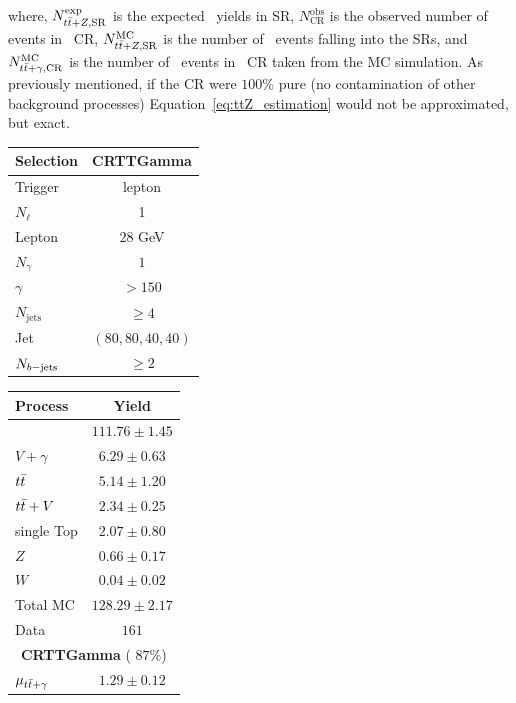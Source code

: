 		\noindent where, $N_{t\bar{t}+Z,\mathrm{SR}}^{\mathrm{exp}}$ is the expected \ttZ\ yields in \ac{SR}, $N_{\mathrm{CR}}^{\mathrm{obs}}$ is the observed number of events in \ttgamma\ \ac{CR}, $N_{t\bar{t}+Z,\mathrm{SR}}^{\mathrm{MC}}$ is the number of \ttZ\ events falling into the \acp{SR}, and $N_{t\bar{t}+\gamma,\mathrm{CR}}^{\mathrm{MC}}$ is the number of \ttgamma\ events in \ttgamma\ \ac{CR} taken from the \ac{MC} simulation. As previously mentioned, if the \ac{CR} were $100\%$ pure (no contamination of other background processes) Equation~\ref{eq:ttZ_estimation} would not be approximated, but exact.

		\begin{table}
			\parbox{.45\linewidth}{
			\centering
			\label{tab:CRTTGamma}
		   	\begin{tabular}{lc}
			      \toprule
			      \textbf{Selection}  & \textbf{CRTTGamma} \\
			      \toprule
			      Trigger & lepton \\ 
			      $N_{\ell}$ & 1 \\
			      Lepton \pt & $28$ GeV \\
			      \midrule
			      $N_{\gamma}$ & $1$\\
			      $\gamma$ \pT\ & $> 150$ \GeV \\
			      \midrule
			      $N_{\mathrm{jets}}$ & $ \geq 4 $ \\
			      Jet \pT\ & $(80,80,40,40)$ \GeV \\
			      $N_{b\mathrm{-jets}}$ & $\ge 2$ \\
			      \bottomrule
			   \end{tabular}
			}
			\hfill
			\parbox{.45\linewidth}{
			\centering
			\label{tab:CRTTGamma_yields}
				\begin{tabular}{lc}
					\toprule
					\textbf{Process} & \textbf{Yield} \\
					\toprule
					\ttgamma & $111.76 \pm 1.45$ \\
					$V+\gamma$ & $6.29 \pm 0.63$ \\
					$t\bar{t}$ & $5.14 \pm 1.20$ \\
					$t\bar{t}+V$ & $2.34 \pm 0.25$ \\
					single Top & $2.07 \pm 0.80$ \\
					$Z$ & $0.66 \pm 0.17$ \\
					$W$ & $0.04 \pm 0.02$ \\
					\midrule
					Total MC & $128.29 \pm 2.17$ \\
					Data & $161$ \\
					\midrule
					\multicolumn{2}{c}{\textbf{CRTTGamma} ( $87\%$)} \\ 
					\midrule
					$\mu_{t\bar{t}+\gamma}$ & $1.29 \pm 0.12$ \\
					\bottomrule
				\end{tabular}
			}
		\end{table}

